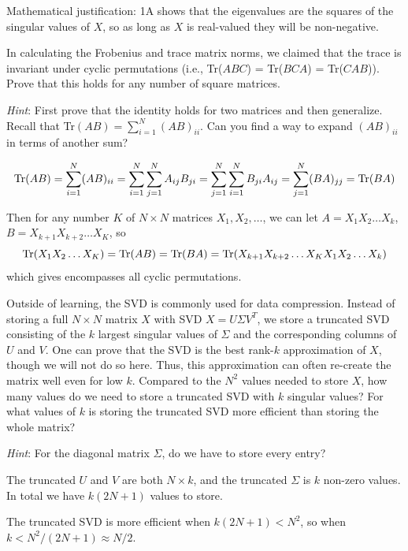 \begin{solution}
	

	Mathematical justification: 1A shows that the eigenvalues are the squares of the singular values of $X$, so as long as $X$ is real-valued they will be non-negative.
\end{solution}

\problem[5] In calculating the Frobenius and trace matrix norms, we claimed that the trace is invariant under cyclic permutations (i.e., Tr($ABC$) = Tr($BCA$) = Tr($CAB$)). Prove that this holds for any number of square matrices.

\textit{Hint}: First prove that the identity holds for two matrices and then generalize. Recall that Tr$(AB) = \sum_{i=1}^{N}(AB)_{ii}$. Can you find a way to expand $(AB)_{ii}$ in terms of another sum?

\begin{solution}
	$$
	\operatorname{Tr}(AB) =
	\sum_{i=1}^N (AB)_{ii} =
	\sum_{i=1}^N \sum_{j=1}^N A_{ij} B_{ji} =
	\sum_{j=1}^N \sum_{i=1}^N B_{ji} A_{ij} =
	\sum_{j=1}^N (BA)_{jj} =
	\operatorname{Tr}(BA)
	$$

	Then for any number $K$ of $N \times N$ matrices $X_1, X_2, \dots$, we can let $A = X_1 X_2 \dots X_k$, $B = X_{k+1} X_{k+2} \dots X_K$, so
	$$ \operatorname{Tr}(X_1 X_2 \dots X_K) = \operatorname{Tr}(AB) = \operatorname{Tr}(BA) = \operatorname{Tr}(X_{k+1} X_{k+2} \dots X_K X_1 X_2 \dots X_k) $$
	which gives encompasses all cyclic permutations.
\end{solution}

\problem[3] Outside of learning, the SVD is commonly used for data compression. Instead of storing a full $N \times N$ matrix $X$ with SVD $X = U\Sigma V^T$, we store a truncated SVD consisting of the $k$ largest singular values of $\Sigma$ and the corresponding columns of $U$ and $V$. One can prove that the SVD is the best rank-$k$ approximation of $X$, though we will not do so here. Thus, this approximation can often re-create the matrix well even for low $k$. Compared to the $N^2$ values needed to store $X$, how many values do we need to store a truncated SVD with $k$ singular values? For what values of $k$ is storing the truncated SVD more efficient than storing the whole matrix?

\textit{Hint}: For the diagonal matrix $\Sigma$, do we have to store every entry?

\begin{solution}
	The truncated $U$ and $V$ are both $N \times k$, and the truncated $\Sigma$ is $k$ non-zero values.
	In total we have $k(2N + 1)$ values to store.

	The truncated SVD is more efficient when $k (2N + 1) < N^2$, so when $k < N^2 / (2N + 1) \approx N / 2$.
\end{solution}

